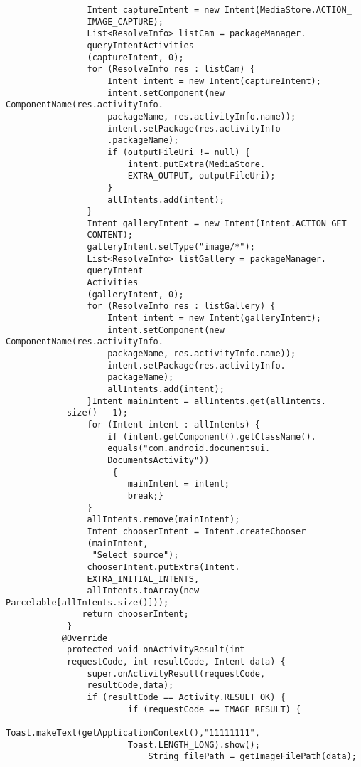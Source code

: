 \documentclass[a4paper,12pt,toc=flat]{report}
\begin{document}
{{{{\begin{itemize}
\begin{verbatim}
 				Intent captureIntent = new Intent(MediaStore.ACTION_
 				IMAGE_CAPTURE);
 				List<ResolveInfo> listCam = packageManager.
 				queryIntentActivities
 				(captureIntent, 0);
 				for (ResolveInfo res : listCam) {
 					Intent intent = new Intent(captureIntent);
 					intent.setComponent(new ComponentName(res.activityInfo.
 					packageName, res.activityInfo.name));
 					intent.setPackage(res.activityInfo
 					.packageName);
 					if (outputFileUri != null) {
 						intent.putExtra(MediaStore.
 						EXTRA_OUTPUT, outputFileUri);
 					}
 					allIntents.add(intent);
 				}
 				Intent galleryIntent = new Intent(Intent.ACTION_GET_
 				CONTENT);
 				galleryIntent.setType("image/*");
 				List<ResolveInfo> listGallery = packageManager.
 				queryIntent
 				Activities
 				(galleryIntent, 0);
 				for (ResolveInfo res : listGallery) {
 					Intent intent = new Intent(galleryIntent);
 					intent.setComponent(new ComponentName(res.activityInfo.
 					packageName, res.activityInfo.name));
 					intent.setPackage(res.activityInfo.
 					packageName);
 					allIntents.add(intent);
 				}Intent mainIntent = allIntents.get(allIntents.
 			size() - 1);
 				for (Intent intent : allIntents) {
 					if (intent.getComponent().getClassName().
 					equals("com.android.documentsui.
 					DocumentsActivity"))
 					 {
 						mainIntent = intent;
 						break;}
 				}
 				allIntents.remove(mainIntent);
 		     	Intent chooserIntent = Intent.createChooser
 		     	(mainIntent,
 		     	 "Select source");
 				chooserIntent.putExtra(Intent.
 				EXTRA_INITIAL_INTENTS, 
 				allIntents.toArray(new Parcelable[allIntents.size()]));
 			   return chooserIntent;
 			}
 		   @Override
 			protected void onActivityResult(int 
 			requestCode, int resultCode, Intent data) {
 				super.onActivityResult(requestCode,
 				resultCode,data);
 				if (resultCode == Activity.RESULT_OK) {
 						if (requestCode == IMAGE_RESULT) {
 						Toast.makeText(getApplicationContext(),"11111111",
 						Toast.LENGTH_LONG).show();
 							String filePath = getImageFilePath(data);
 					

\end{verbatim}
\end{itemize}}}}}
\end{document}

